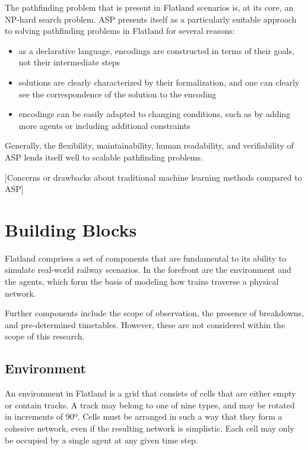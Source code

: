 \documentclass[11pt]{article}
\begin{document}

The pathfinding problem that is present in Flatland scenarios is, at its core, an NP-hard search problem.  ASP presents itself as a particularly suitable approach to solving pathfinding problems in Flatland for several reasons:
\begin{itemize}
	\item as a declarative language, encodings are constructed in terms of their goals, not their intermediate steps
	\item solutions are clearly characterized by their formalization, and one can clearly see the correspondence of the solution to the encoding
	\item encodings can be easily adapted to changing conditions, such as by adding more agents or including additional constraints
\end{itemize}

\noindent Generally, the flexibility, maintainability, human readability, and verifiability of ASP lends itself well to scalable pathfinding problems. \medskip

[Concerns or drawbacks about traditional machine learning methods compared to ASP]

\section{Building Blocks}
Flatland comprises a set of components that are fundamental to its ability to simulate real-world railway scenarios.  In the forefront are the environment and the agents, which form the basis of modeling how trains traverse a physical network.

Further components include the scope of observation, the presence of breakdowns, and pre-determined timetables.  However, these are not considered within the scope of this research.

\subsection{Environment}
\label{sec:Environment}
An environment in Flatland is a grid that consists of cells that are either empty or contain tracks.  A track may belong to one of nine types, and may be rotated in increments of 90º.  Cells must be arranged in such a way that they form a cohesive network, even if the resulting network is simplistic.  Each cell may only be occupied by a single agent at any given time step.
\end{document}
